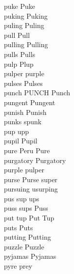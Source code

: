 puke Puke\\
puking Puking\\
puling Puling\\
pull Pull\\
pulling Pulling\\
pulls Pulls\\
pulp Plup\\
pulper purple\\
pulses Pulses\\
punch PUNCH Punch\\
pungent Pungent\\
punish Punish\\
punks spunk\\
pup upp\\
pupil Pupil\\
pure Peru Pure\\
purgatory Purgatory\\
purple pulper\\
purse Purse super\\
pursuing usurping\\
pus sup ups\\
puss sups Puss\\
put tup Put Tup\\
puts Puts\\
putting Putting\\
puzzle Puzzle\\
pyjamas Pyjamas\\
pyre prey\\

